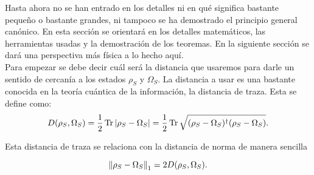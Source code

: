 Hasta ahora no se han entrado en los detalles ni en qué significa bastante pequeño o bastante grandes, ni tampoco se ha demostrado el principio general canónico. En esta sección se orientará en los detalles matemáticos, las herramientas usadas y la demostración de los teoremas. En la siguiente sección se dará una perspectiva más física a lo hecho aquí.
\\
Para empezar se debe decir cuál será la distancia que usaremos para darle un sentido de cercanía a los estados $\rho_{S}$ y $\Omega_{S}$. La distancia a usar es una bastante conocida en la teoría cuántica de la información, la distancia de traza. Esta se define como:
\begin{equation}
D(\rho_{S}, \Omega_{S})= \frac{1}{2} \Tr |\rho_{S} -\Omega_{S}|=\frac{1}{2} \Tr \sqrt{(\rho_{S} -\Omega_{S})^{\dag}(\rho_{S} -\Omega_{S})}.
\end{equation}

Esta distancia de traza se relaciona con la distancia de norma de manera sencilla

\begin{equation}
\norm{\rho_{S}-\Omega_{S}}_{1}=2 D(\rho_{S}, \Omega_{S}).
\end{equation}

